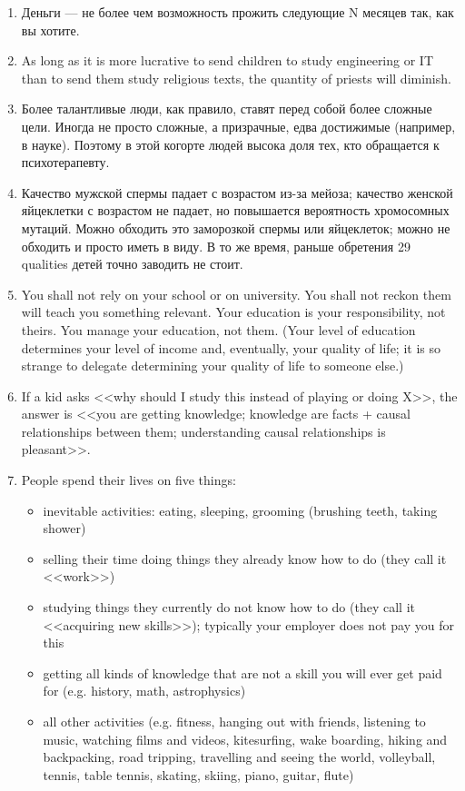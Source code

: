 \documentclass[11pt]{article}
\theoremstyle{remark}
\theoremstyle{definition}
\begin{document}
\begin{enumerate}
\item Деньги --- не более чем возможность прожить следующие N месяцев так, как вы хотите.


\item As long as it is more lucrative to send children to study engineering or IT than to send them study religious texts, the quantity of priests will diminish.


\item Более талантливые люди, как правило, ставят перед собой более сложные цели. Иногда не просто сложные, а призрачные, едва достижимые (например, в науке). Поэтому в этой когорте людей высока доля тех, кто обращается к психотерапевту. 


\item Качество мужской спермы падает с возрастом из-за мейоза; качество женской яйцеклетки с возрастом не падает, но повышается вероятность хромосомных мутаций. Можно обходить это заморозкой спермы или яйцеклеток; можно не обходить и просто иметь в виду. В то же время, раньше обретения 29 qualities детей точно заводить не стоит.


\item You shall not rely on your school or on university. You shall not reckon them will teach you something relevant. Your education is your responsibility, not theirs. You manage your education, not them. (Your level of education determines your level of income and, eventually, your quality of life; it is so strange to delegate determining your quality of life to someone else.)

\item If a kid asks <<why should I study this instead of playing or doing X>>, the answer is <<you are getting knowledge; knowledge are facts + causal relationships between them; understanding causal relationships is pleasant>>.

\item People spend their lives on five things:

\begin{itemize}
\item inevitable activities: eating, sleeping, grooming (brushing teeth, taking shower)
\item selling their time doing things they already know how to do (they call it <<work>>)
\item studying things they currently do not know how to do (they call it <<acquiring new skills>>); typically your employer does not pay you for this
\item getting all kinds of knowledge that are not a skill you will ever get paid for (e.g. history, math, astrophysics)
\item all other activities (e.g. fitness, hanging out with friends, listening to music, watching films and videos, kitesurfing, wake boarding, hiking and backpacking, road tripping, travelling and seeing the world, volleyball, tennis, table tennis, skating, skiing, piano, guitar, flute)
\end{itemize}


\end{enumerate}
\end{document}
